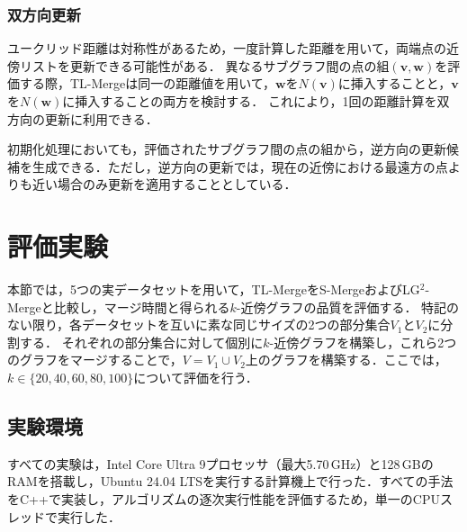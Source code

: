 \documentclass[submit,techrep,noauthor]{ipsj}
\newcommand{\vb}[1]{\boldsymbol{#1}}
\begin{document}

\subsubsection{双方向更新}
ユークリッド距離は対称性があるため，一度計算した距離を用いて，両端点の近傍リストを更新できる可能性がある．
異なるサブグラフ間の点の組$(\vb{v},\vb{w})$を評価する際，TL-Mergeは同一の距離値を用いて，$\vb{w}$を$N(\vb{v})$に挿入することと，$\vb{v}$を$N(\vb{w})$に挿入することの両方を検討する．
これにより，1回の距離計算を双方向の更新に利用できる．

初期化処理においても，評価されたサブグラフ間の点の組から，逆方向の更新候補を生成できる．ただし，逆方向の更新では，現在の近傍における最遠方の点よりも近い場合のみ更新を適用することとしている．



\section{評価実験}
\label{sec:experiments}
本節では，5つの実データセットを用いて，TL-MergeをS-MergeおよびLG$^2$-Mergeと比較し，マージ時間と得られる$k$-近傍グラフの品質を評価する．
特記のない限り，各データセットを互いに素な同じサイズの2つの部分集合$V_1$と$V_2$に分割する．
それぞれの部分集合に対して個別に$k$-近傍グラフを構築し，これら2つのグラフをマージすることで，$V=V_1\cup V_2$上のグラフを構築する．ここでは，$k\in\{20,40,60,80,100\}$について評価を行う．

\subsection{実験環境}
すべての実験は，Intel Core Ultra 9プロセッサ（最大5.70\,GHz）と128\,GBのRAMを搭載し，Ubuntu 24.04 LTSを実行する計算機上で行った．すべての手法をC++で実装し，アルゴリズムの逐次実行性能を評価するため，単一のCPUスレッドで実行した．
\end{document}
